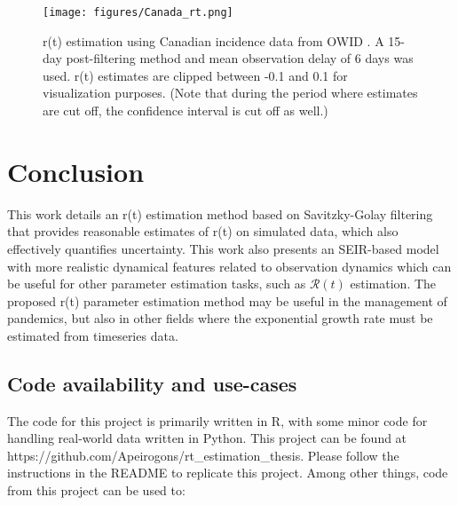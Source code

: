 \documentclass{article}
\newcommand{\nR}{\mathcal{R}}
\begin{document}
\clearpage
\begin{figure}[h!]
\centering
\texttt{[image: figures/Canada\_rt.png]}
\caption{r(t) estimation using Canadian incidence data from OWID \cite{OWID}. A 15-day post-filtering method and mean observation delay of 6 days was used. r(t) estimates are clipped between -0.1 and 0.1 for visualization purposes. (Note that during the period where estimates are cut off, the confidence interval is cut off as well.)}
\end{figure}

\section{Conclusion}
This work details an r(t) estimation method based on Savitzky-Golay filtering that provides reasonable estimates of r(t) on simulated data, which also effectively quantifies uncertainty. This work also presents an SEIR-based model with more realistic dynamical features related to observation dynamics which can be useful for other parameter estimation tasks, such as $\nR(t)$ estimation. The proposed r(t) parameter estimation method may be useful in the management of pandemics, but also in other fields where the exponential growth rate must be estimated from timeseries data. 


\subsection{Code availability and use-cases}
The code for this project is primarily written in R, with some minor code for handling real-world data written in Python. This project can be found at https://github.com/Apeirogons/rt\_estimation\_thesis. Please follow the instructions in the README to replicate this project. Among other things, code from this project can be used to:
\end{document}
